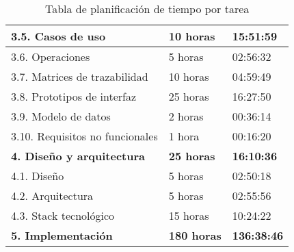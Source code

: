 \begin{table}[!ht]
\begin{tabular}{|l|l|l|}
        3.5. Casos de uso & 10 horas & 15:51:59 \\ \hline
        3.6. Operaciones & 5 horas & 02:56:32 \\ \hline
        3.7. Matrices de trazabilidad & 10 horas & 04:59:49 \\ \hline
        3.8. Prototipos de interfaz & 25 horas & 16:27:50 \\ \hline
        3.9. Modelo de datos & 2 horas & 00:36:14 \\ \hline
        3.10. Requisitos no funcionales & 1 hora & 00:16:20 \\ \hline
        \textbf{4.  Diseño y arquitectura} & \textbf{25 horas} & \textbf{16:10:36} \\ \hline
        4.1. Diseño & 5 horas & 02:50:18 \\ \hline
        4.2. Arquitectura & 5 horas & 02:55:56 \\ \hline
        4.3. Stack tecnológico & 15 horas & 10:24:22 \\ \hline
        \textbf{5. Implementación} & \textbf{180 horas} & \textbf{136:38:46} \\ \hline
    \end{tabular}
    \caption{Tabla de planificación de tiempo por tarea}
    \label{tabla:planificacion}
\end{table}